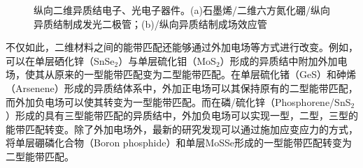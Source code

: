     \begin{figure}[htb]
        \caption{纵向二维异质结电子、光电子器件。(a)石墨烯/二维六方氮化硼/纵向异质结制成发光二极管；(b)/纵向异质结制成场效应管}
    \end{figure}

    不仅如此，二维材料之间的能带匹配还能够通过外加电场等方式进行改变。例如，可以在单层硒化锌（SnSe$_2$）与单层硫化钼（MoS$_2$）形成的异质结中附加外加电场，使其从原来的一型能带匹配变为二型能带匹配。在单层硫化锗（GeS）和砷烯（Arsenene）形成的异质结体系中，外加正电场可以其保持原有的二型能带匹配，而外加负电场可以使其转变为一型能带匹配。而在磷/硫化锌（Phosphorene/SnS$_2$）形成的具有三型能带匹配的异质结中，外加负电场可以实现一型，二型，三型的能带匹配转变。除了外加电场外，最新的研究发现可以通过施加应变应力的方式，将单层硼磷化合物（Boron phosphide）和单层MoSSe形成的一型能带匹配转变为二型能带匹配。

